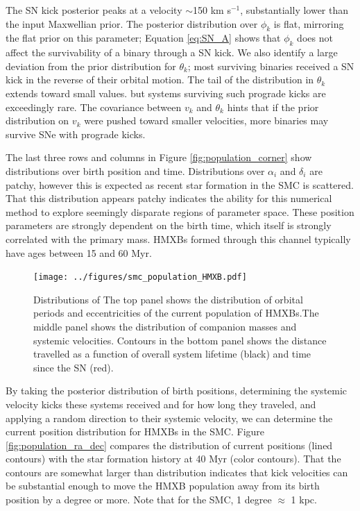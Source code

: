 \documentclass[usenatbib]{mnras}
\begin{document}
The SN kick posterior peaks at a velocity $\sim$150 km s$^{-1}$, substantially lower than the input Maxwellian prior. The posterior distribution over $\phi_k$ is flat, mirroring the flat prior on this parameter; Equation \ref{eq:SN_A} shows that $\phi_k$ does not affect the survivability of a binary through a SN kick. We also identify a large deviation from the prior distribution for $\theta_k$; most surviving binaries received a SN kick in the reverse of their orbital motion. The tail of the distribution in $\theta_k$ extends toward small values. but systems surviving such prograde kicks are exceedingly rare. The covariance between $v_k$ and $\theta_k$ hints that if the prior distribution on $v_k$ were pushed toward smaller velocities, more binaries may survive SNe with prograde kicks. 

The last three rows and columns in Figure \ref{fig:population_corner} show distributions over birth position and time. Distributions over $\alpha_i$ and $\delta_i$ are patchy, however this is expected as recent star formation in the SMC is scattered. That this distribution appears patchy indicates the ability for this numerical method to explore seemingly disparate regions of parameter space. These position parameters are strongly dependent on the birth time, which itself is strongly correlated with the primary mass. HMXBs formed through this channel typically have ages between 15 and 60 Myr.


\begin{figure}
\begin{center}
\texttt{[image: ../figures/smc\_population\_HMXB.pdf]}
\caption{ Distributions of The top panel shows the distribution of orbital periods and eccentricities of the current population of HMXBs.The middle panel shows the distribution of companion masses and systemic velocities. Contours in the bottom panel shows the distance travelled as a function of  overall system lifetime (black) and time since the SN (red). }
\label{fig:smc_population_HMXB}
\end{center}
\end{figure}


By taking the posterior distribution of birth positions, determining the systemic velocity kicks these systems received and for how long they traveled, and applying a random direction to their systemic velocity, we can determine the current position distribution for HMXBs in the SMC. Figure \ref{fig:population_ra_dec} compares the distribution of current positions (lined contours) with the star formation history at 40 Myr (color contours). That the contours are somewhat larger than distribution indicates that kick velocities can be substantial enough to move the HMXB population away from its birth position by a degree or more. Note that for the SMC, 1 degree $\approx$ 1 kpc.
\end{document}
